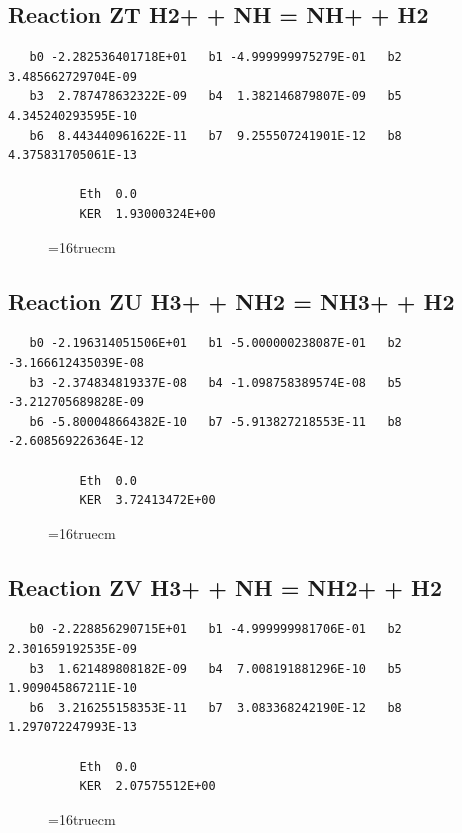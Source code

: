 \documentclass[12pt,dvipdfm]{article}
\begin{document}
\subsection{
Reaction ZT H2+ + NH = NH+ + H2 }
\begin{small}\begin{verbatim}
   b0 -2.282536401718E+01   b1 -4.999999975279E-01   b2  3.485662729704E-09
   b3  2.787478632322E-09   b4  1.382146879807E-09   b5  4.345240293595E-10
   b6  8.443440961622E-11   b7  9.255507241901E-12   b8  4.375831705061E-13

          Eth  0.0
          KER  1.93000324E+00
\end{verbatim}\end{small}
\begin{figure}[h!] \label{n2rates}
\epsfxsize=16truecm
\end{figure}
\newpage

\subsection{
Reaction ZU H3+ + NH2 = NH3+ + H2 }
\begin{small}\begin{verbatim}
   b0 -2.196314051506E+01   b1 -5.000000238087E-01   b2 -3.166612435039E-08
   b3 -2.374834819337E-08   b4 -1.098758389574E-08   b5 -3.212705689828E-09
   b6 -5.800048664382E-10   b7 -5.913827218553E-11   b8 -2.608569226364E-12

          Eth  0.0
          KER  3.72413472E+00
\end{verbatim}\end{small}
\begin{figure}[h!] \label{n2rates}
\epsfxsize=16truecm
\end{figure}
\newpage

\subsection{
Reaction ZV H3+ + NH = NH2+ + H2 }
\begin{small}\begin{verbatim}
   b0 -2.228856290715E+01   b1 -4.999999981706E-01   b2  2.301659192535E-09
   b3  1.621489808182E-09   b4  7.008191881296E-10   b5  1.909045867211E-10
   b6  3.216255158353E-11   b7  3.083368242190E-12   b8  1.297072247993E-13

          Eth  0.0
          KER  2.07575512E+00
\end{verbatim}\end{small}
\begin{figure}[h!] \label{n2rates}
\epsfxsize=16truecm
\end{figure}
\newpage
\end{document}
